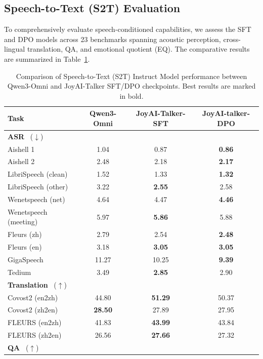 \subsection{Speech-to-Text (S2T) Evaluation}

To comprehensively evaluate speech-conditioned capabilities, we assess the SFT and DPO models across 23 benchmarks spanning acoustic perception, cross-lingual translation, QA, and emotional quotient (EQ). The comparative results are summarized in Table~\ref{tab:s2t_instruct_eval}.

\begin{table}[ht]
\centering
\caption{Comparison of Speech-to-Text (S2T) Instruct Model performance between Qwen3-Omni and JoyAI-Talker SFT/DPO checkpoints. Best results are marked in bold.}
\label{tab:s2t_instruct_eval}
\begin{tabular}{lccc}
\toprule
\textbf{Task} & \textbf{Qwen3-Omni} & \textbf{JoyAI-Talker-SFT} & \textbf{JoyAI-talker-DPO} \\
\midrule
\rowcolor[gray]{0.92} \textbf{ASR} ~($\downarrow$) & & & \\
\quad Aishell 1 & 1.04 & 0.87 & \textbf{0.86} \\
\quad Aishell 2 & 2.48 & 2.18 & \textbf{2.17} \\
\quad LibriSpeech (clean) & 1.52 & 1.33 & \textbf{1.32} \\
\quad LibriSpeech (other) & 3.22 & \textbf{2.55} & 2.58 \\
\quad Wenetspeech (net) & 4.64 & 4.47 & \textbf{4.46} \\
\quad Wenetspeech (meeting) & 5.97 & \textbf{5.86} & 5.88 \\
\quad Fleurs (zh) & 2.79 & 2.54 & \textbf{2.48} \\
\quad Fleurs (en) & 3.18 & \textbf{3.05} & \textbf{3.05} \\
\quad GigaSpeech & 11.27 & 10.25 & \textbf{9.39} \\
\quad Tedium & 3.49 & \textbf{2.85} & 2.90 \\
\hline
\rowcolor[gray]{0.92} \textbf{Translation} ~($\uparrow$) & & & \\
\quad Covost2 (en2zh) & 44.80 & \textbf{51.29} & 50.37 \\
\quad Covost2 (zh2en) & \textbf{28.50} & 27.89 & 27.95 \\
\quad FLEURS (en2zh) & 41.83 & \textbf{43.99} & 43.84 \\
\quad FLEURS (zh2en) & 26.56 & \textbf{27.66} & 27.32 \\
\hline
\rowcolor[gray]{0.92} \textbf{QA} ~($\uparrow$) & & & \\

\end{tabular}
\end{table}
